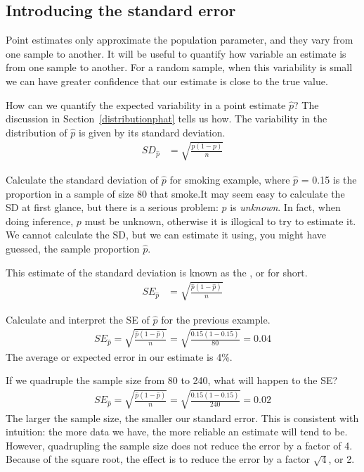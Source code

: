 \subsection{Introducing the standard error}

Point estimates only approximate the population parameter, and they vary from one sample to another. It will be useful to quantify how variable an estimate is from one sample to another. For a random sample, when this variability is small we can have greater confidence that our estimate is close to the true value.

How can we quantify the expected variability in a point estimate $\hat{p}$? The discussion in Section~\ref{distributionphat} tells us how. The variability in the distribution of $\hat{p}$ is given by its standard deviation.
\begin{align*}
SD_{\hat{p}}&=\sqrt{\frac{p(1-p)}{n}}
\end{align*}

\begin{example}{Calculate the standard deviation of $\hat{p}$ for smoking example, where $\hat{p}$ = 0.15 is the proportion in a sample of size 80 that smoke.}It may seem easy to calculate the SD at first glance, but there is a serious problem: $p$ is \emph{unknown}. In fact, when doing inference, $p$ must be unknown, otherwise it is illogical to try to estimate it. We cannot calculate the SD, but we can estimate it using, you might have guessed, the sample proportion $\hat{p}$.
\end{example}
 
This estimate of the standard deviation is known as the , or  for short.
\begin{align*}
SE_{\hat{p}}&=\sqrt{\frac{\hat{p}(1-\hat{p})}{n}}
\end{align*}

\begin{example}{Calculate and interpret the SE of $\hat{p}$ for the previous example.}
\begin{align*}
SE_{\hat{p}}=\sqrt{\frac{\hat{p}(1-\hat{p})}{n}} =\sqrt{\frac{0.15(1-0.15)}{80}}=0.04
\end{align*}
The average or expected error in our estimate is 4\%.
\end{example}

\begin{example}{If we quadruple the sample size from 80 to 240, what will happen to the SE?}
\begin{align*}
SE_{\hat{p}}=\sqrt{\frac{\hat{p}(1-\hat{p})}{n}} =\sqrt{\frac{0.15(1-0.15)}{240}}=0.02
\end{align*}
The larger the sample size, the smaller our standard error. This is consistent with intuition: the more data we have, the more reliable an estimate will tend to be. However, quadrupling the sample size does not reduce the error by a factor of 4. Because of the square root, the effect is to reduce the error by a factor $\sqrt{4}$, or 2. 
\end{example}



